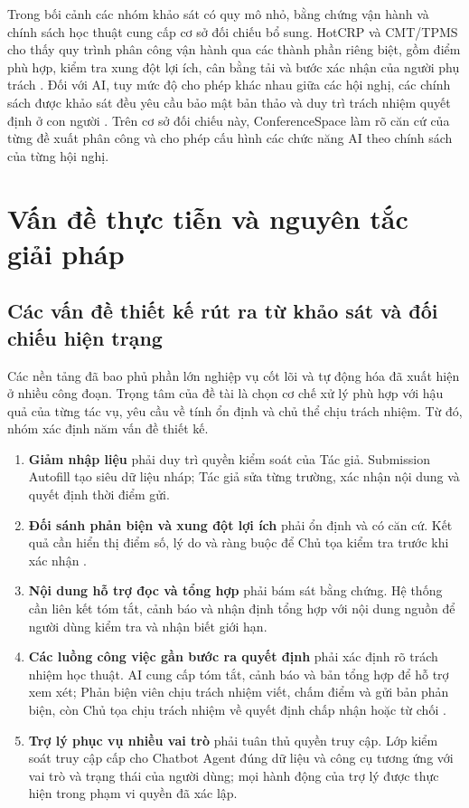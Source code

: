 Trong bối cảnh các nhóm khảo sát có quy mô nhỏ, bằng chứng vận hành và chính sách học thuật cung cấp cơ sở đối chiếu bổ sung. HotCRP và CMT/TPMS cho thấy quy trình phân công vận hành qua các thành phần riêng biệt, gồm điểm phù hợp, kiểm tra xung đột lợi ích, cân bằng tải và bước xác nhận của người phụ trách \cite{ch2ref58,ch2ref61}. Đối với AI, tuy mức độ cho phép khác nhau giữa các hội nghị, các chính sách được khảo sát đều yêu cầu bảo mật bản thảo và duy trì trách nhiệm quyết định ở con người \cite{ch2ref15,ch2ref16,ch2ref40,ch2ref41}. Trên cơ sở đối chiếu này, ConferenceSpace làm rõ căn cứ của từng đề xuất phân công và cho phép cấu hình các chức năng AI theo chính sách của từng hội nghị.

\section{Vấn đề thực tiễn và nguyên tắc giải pháp}
\label{sec:ch2-design-issues}

\subsection{Các vấn đề thiết kế rút ra từ khảo sát và đối chiếu hiện trạng}

Các nền tảng đã bao phủ phần lớn nghiệp vụ cốt lõi và tự động hóa đã xuất hiện ở nhiều công đoạn. Trọng tâm của đề tài là chọn cơ chế xử lý phù hợp với hậu quả của từng tác vụ, yêu cầu về tính ổn định và chủ thể chịu trách nhiệm. Từ đó, nhóm xác định năm vấn đề thiết kế.

\begin{enumerate}
    \item \textbf{Giảm nhập liệu} phải duy trì quyền kiểm soát của Tác giả. Submission Autofill tạo siêu dữ liệu nháp; Tác giả sửa từng trường, xác nhận nội dung và quyết định thời điểm gửi.
    
    \item \textbf{Đối sánh phản biện và xung đột lợi ích} phải ổn định và có căn cứ. Kết quả cần hiển thị điểm số, lý do và ràng buộc để Chủ tọa kiểm tra trước khi xác nhận \cite{ch2ref8,ch2ref55}.
    
    \item \textbf{Nội dung hỗ trợ đọc và tổng hợp} phải bám sát bằng chứng. Hệ thống cần liên kết tóm tắt, cảnh báo và nhận định tổng hợp với nội dung nguồn để người dùng kiểm tra và nhận biết giới hạn.
    
    \item \textbf{Các luồng công việc gần bước ra quyết định} phải xác định rõ trách nhiệm học thuật. AI cung cấp tóm tắt, cảnh báo và bản tổng hợp để hỗ trợ xem xét; Phản biện viên chịu trách nhiệm viết, chấm điểm và gửi bản phản biện, còn Chủ tọa chịu trách nhiệm về quyết định chấp nhận hoặc từ chối \cite{ch2ref15,ch2ref16,ch2ref17,ch2ref18}.
    
    \item \textbf{Trợ lý phục vụ nhiều vai trò} phải tuân thủ quyền truy cập. Lớp kiểm soát truy cập cấp cho Chatbot Agent đúng dữ liệu và công cụ tương ứng với vai trò và trạng thái của người dùng; mọi hành động của trợ lý được thực hiện trong phạm vi quyền đã xác lập.
\end{enumerate}

